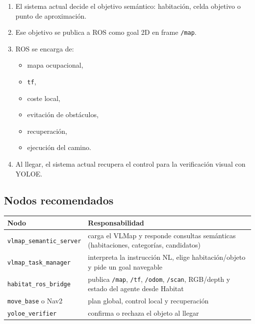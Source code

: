 \documentclass[11pt,a4paper]{article}
\begin{document}
\begin{enumerate}
  \item El sistema actual decide el objetivo semántico:
        habitación, celda objetivo o punto de aproximación.
  \item Ese objetivo se publica a ROS como goal 2D en frame \texttt{/map}.
  \item ROS se encarga de:
        \begin{itemize}
          \item mapa ocupacional,
          \item \texttt{tf},
          \item coste local,
          \item evitación de obstáculos,
          \item recuperación,
          \item ejecución del camino.
        \end{itemize}
  \item Al llegar, el sistema actual recupera el control para la verificación
        visual con YOLOE.
\end{enumerate}

\subsection{Nodos recomendados}

\begin{center}
\begin{tabular}{>{\raggedright\arraybackslash}p{4cm} >{\raggedright\arraybackslash}p{10cm}}
\toprule
\textbf{Nodo} & \textbf{Responsabilidad} \\
\midrule
\texttt{vlmap\_semantic\_server} & carga el VLMap y responde consultas semánticas (habitaciones, categorías, candidatos) \\
\texttt{vlmap\_task\_manager} & interpreta la instrucción NL, elige habitación/objeto y pide un goal navegable \\
\texttt{habitat\_ros\_bridge} & publica \texttt{/map}, \texttt{/tf}, \texttt{/odom}, \texttt{/scan}, RGB/depth y estado del agente desde Habitat \\
\texttt{move\_base} o Nav2 & plan global, control local y recuperación \\
\texttt{yoloe\_verifier} & confirma o rechaza el objeto al llegar \\
\bottomrule
\end{tabular}
\end{center}
\end{document}

